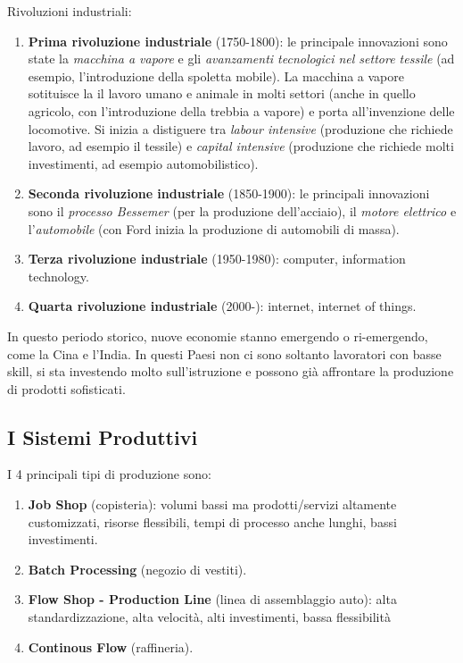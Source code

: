 \documentclass[a4paper,portrait,12pt]{article}
\theoremstyle{definition}
\begin{document}
Rivoluzioni industriali:
\begin{enumerate}
\item \textbf{Prima rivoluzione industriale} (1750-1800): le principale innovazioni sono state la \emph{macchina a vapore} e gli \emph{avanzamenti tecnologici nel settore tessile} (ad esempio, l'introduzione della spoletta mobile).
La macchina a vapore sotituisce la il lavoro umano e animale in molti settori (anche in quello agricolo, con l'introduzione della trebbia a vapore) e porta all'invenzione delle locomotive.
Si inizia a distiguere tra \emph{labour intensive} (produzione che richiede lavoro, ad esempio il tessile) e \emph{capital intensive} (produzione che richiede molti investimenti, ad esempio automobilistico).
\item \textbf{Seconda rivoluzione industriale} (1850-1900): le principali innovazioni sono il \emph{processo Bessemer} (per la produzione dell'acciaio), il \emph{motore elettrico} e l'\emph{automobile} (con Ford inizia la produzione di automobili di massa).
\item \textbf{Terza rivoluzione industriale} (1950-1980): computer, information technology.
\item \textbf{Quarta rivoluzione industriale} (2000-): internet, internet of things.
\end{enumerate}

In questo periodo storico, nuove economie stanno emergendo o ri-emergendo, come la Cina e l'India.
In questi Paesi non ci sono soltanto lavoratori con basse skill, si sta investendo molto sull'istruzione e possono già affrontare la produzione di prodotti sofisticati.


\subsection{I Sistemi Produttivi}

I 4 principali tipi di produzione sono:
\begin{enumerate}
\item \textbf{Job Shop} (copisteria): volumi bassi ma prodotti/servizi altamente customizzati, risorse flessibili, tempi di processo anche lunghi, bassi investimenti.
\item \textbf{Batch Processing} (negozio di vestiti).
\item \textbf{Flow Shop - Production Line} (linea di assemblaggio auto): alta standardizzazione, alta velocità, alti investimenti, bassa flessibilità
\item \textbf{Continous Flow} (raffineria).
\end{enumerate}
\end{document}
